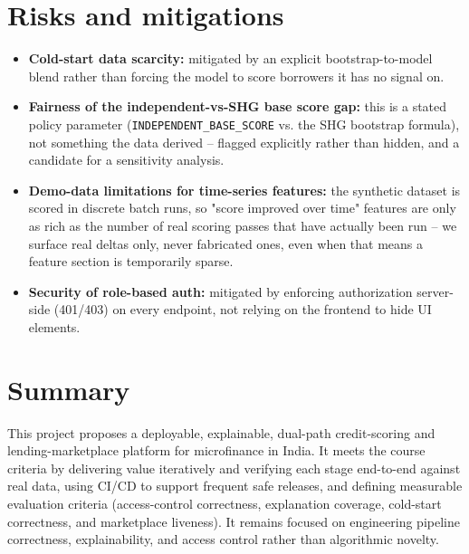 \documentclass[11pt,a4paper]{article}
\begin{document}
\section{Risks and mitigations}
\begin{itemize}[leftmargin=0.7cm]
    \item \textbf{Cold-start data scarcity:} mitigated by
    an explicit bootstrap-to-model blend rather than
    forcing the model to score borrowers it has no signal
    on.
    \item \textbf{Fairness of the independent-vs-SHG base
    score gap:} this is a stated policy parameter
    (\texttt{INDEPENDENT\_BASE\_SCORE} vs. the SHG
    bootstrap formula), not something the data derived --
    flagged explicitly rather than hidden, and a candidate
    for a sensitivity analysis.
    \item \textbf{Demo-data limitations for time-series
    features:} the synthetic dataset is scored in discrete
    batch runs, so "score improved over time" features are
    only as rich as the number of real scoring passes that
    have actually been run -- we surface real deltas only,
    never fabricated ones, even when that means a feature
    section is temporarily sparse.
    \item \textbf{Security of role-based auth:} mitigated
    by enforcing authorization server-side (401/403) on
    every endpoint, not relying on the frontend to hide
    UI elements.
\end{itemize}

\section{Summary}
This project proposes a deployable, explainable, dual-path
credit-scoring and lending-marketplace platform for
microfinance in India. It meets the course criteria by
delivering value iteratively and verifying each stage
end-to-end against real data, using CI/CD to support
frequent safe releases, and defining measurable evaluation
criteria (access-control correctness, explanation
coverage, cold-start correctness, and marketplace
liveness). It remains focused on engineering pipeline
correctness, explainability, and access control rather
than algorithmic novelty.
\end{document}
